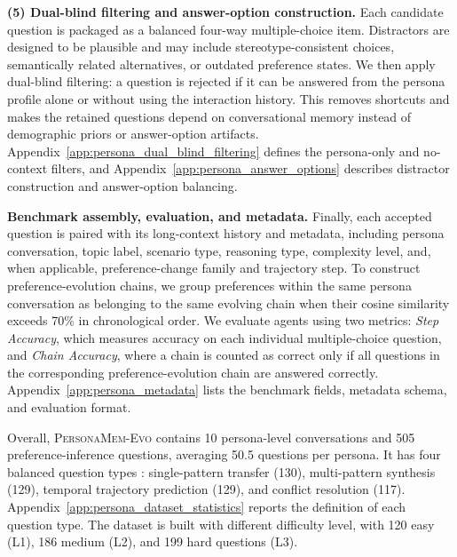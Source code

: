 \documentclass{article}
\begin{document}
\textbf{(5) Dual-blind filtering and answer-option construction.}
Each candidate question is packaged as a balanced four-way multiple-choice item. Distractors are designed to be plausible and may include stereotype-consistent choices, semantically related alternatives, or outdated preference states. We then apply dual-blind filtering: a question is rejected if it can be answered from the persona profile alone or without using the interaction history. This removes shortcuts and makes the retained questions depend on conversational memory instead of demographic priors or answer-option artifacts. Appendix~\ref{app:persona_dual_blind_filtering} defines the persona-only and no-context filters, and Appendix~\ref{app:persona_answer_options} describes distractor construction and answer-option balancing.

\textbf{Benchmark assembly, evaluation, and metadata.} \noindent
Finally, each accepted question is paired with its long-context history and metadata, including persona conversation, topic label, scenario type, reasoning type, complexity level, and, when applicable, preference-change family and trajectory step. To construct preference-evolution chains, we group preferences within the same persona conversation as belonging to the same evolving chain when their cosine similarity exceeds 70\% in chronological order. 
We evaluate agents using two metrics: \emph{Step Accuracy}, which measures accuracy on each individual multiple-choice question, and \emph{Chain Accuracy}, where a chain is counted as correct only if all questions in the corresponding preference-evolution chain are answered correctly. 
Appendix~\ref{app:persona_metadata} lists the benchmark fields, metadata schema, and evaluation format.


Overall, \textsc{PersonaMem-Evo} contains 10 persona-level conversations and 505 preference-inference questions, averaging 50.5 questions per persona. It has four balanced question types : single-pattern transfer (130), multi-pattern synthesis (129), temporal trajectory prediction (129), and conflict resolution (117).
Appendix~\ref{app:persona_dataset_statistics} reports the definition of each question type.
The dataset is built with different difficulty level, with 120 easy (L1), 186 medium (L2), and 199 hard questions (L3). 
\end{document}
